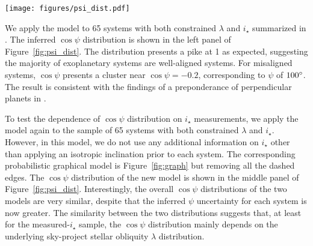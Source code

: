 \documentclass[twocolumn,times]{aastex631}
\newcommand{\numistar}{65\xspace}
\newcommand{\numall}{161\xspace}
\begin{document}
\begin{figure*}[ht!]
    \begin{centering}
        \texttt{[image: figures/psi\_dist.pdf]}
        \caption{The distributions of the cosine of 3D stellar obliquity $\cos{\psi}$. The left panel presents the inferred $\cos{\psi}$ distribution for the \numistar systems that have both sky-projected stellar obliquity $\lambda$ and stellar inclination $i_\star$ measurements using the statistical model described in Figure~\ref{fig:graph}. The middle panel uses the same sample as the left panel but now removes the likelihood function on $i_\star$. The right panel presents the $\cos{\psi}$ distribution for all \numall systems that have sky-projected stellar obliquity $\lambda$ measurements and has no likelihood function on $i_\star$. The $\cos{\psi}$ distribution for the observed-$i_\star$ are similar and both show a cluster near $\cos{\psi} = -0.2$, whereas the distribution for all systems does not have such a trend.}
        \label{fig:psi_dist}
    \end{centering}
\end{figure*}

We apply the model to \numistar systems with both constrained $\lambda$ and $i_\star$ summarized in \cite{Albrecht21}. The inferred $\cos{\psi}$ distribution is shown in the left panel of Figure~\ref{fig:psi_dist}. The distribution presents a pike at 1 as expected, suggesting the majority of exoplanetary systems are well-aligned systems. For misaligned systems, $\cos{\psi}$ presents a cluster near $\cos{\psi} = -0.2$, corresponding to $\psi$ of $100\mbox{$^\circ$}$. The result is consistent with the findings of a preponderance of perpendicular planets in \cite{Albrecht21}.

To test the dependence of $\cos{\psi}$ distribution on $i_\star$ measurements, we apply the model again to the sample of \numistar systems with both constrained $\lambda$ and $i_\star$. However, in this model, we do not use any additional information on $i_\star$ other than applying an isotropic inclination prior to each system. The corresponding probabilistic graphical model is Figure~\ref{fig:graph} but removing all the dashed edges.
The $\cos{\psi}$ distribution of the new model is shown in the middle panel of Figure~\ref{fig:psi_dist}. Interestingly, the overall $\cos{\psi}$ distributions of the two models are very similar, despite that the inferred $\psi$ uncertainty for each system is now greater.
The similarity between the two distributions suggests that, at least for the measured-$i_\star$ sample, the $\cos{\psi}$ distribution mainly depends on the underlying sky-project stellar obliquity $\lambda$ distribution.
\end{document}
